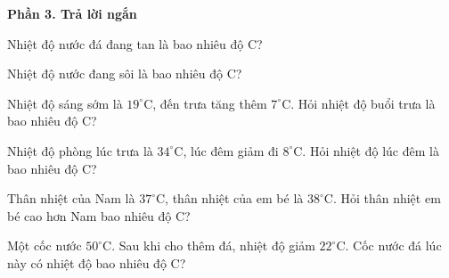 \textbf{Phần 3. Trả lời ngắn}

\begin{ex} %
Nhiệt độ nước đá đang tan là bao nhiêu độ C?
\end{ex}

\begin{ex} %
Nhiệt độ nước đang sôi là bao nhiêu độ C?
\end{ex}

\begin{ex} %
Nhiệt độ sáng sớm là $19^\circ\text{C}$, đến trưa tăng thêm $7^\circ\text{C}$. Hỏi nhiệt độ buổi trưa là bao nhiêu độ C?
\end{ex}

\begin{ex} %
Nhiệt độ phòng lúc trưa là $34^\circ\text{C}$, lúc đêm giảm đi $8^\circ\text{C}$. Hỏi nhiệt độ lúc đêm là bao nhiêu độ C?
\end{ex}

\begin{ex} %
Thân nhiệt của Nam là $37^\circ\text{C}$, thân nhiệt của em bé là $38^\circ\text{C}$. Hỏi thân nhiệt em bé cao hơn Nam bao nhiêu độ C?
\end{ex}

\begin{ex} %
Một cốc nước $50^\circ\text{C}$. Sau khi cho thêm đá, nhiệt độ giảm $22^\circ\text{C}$. Cốc nước đá lúc này có nhiệt độ bao nhiêu độ C?
\end{ex}
